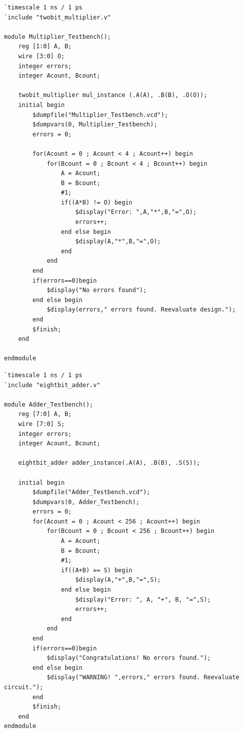 \begin{lstlisting}[style=verilogStyle, caption=Multiplier Testbench in Verilog, label=verilog_multiplierTB]
`timescale 1 ns / 1 ps
`include "twobit_multiplier.v"

module Multiplier_Testbench();
    reg [1:0] A, B;
    wire [3:0] O;
    integer errors;
    integer Acount, Bcount;

    twobit_multiplier mul_instance (.A(A), .B(B), .O(O));
    initial begin
        $dumpfile("Multiplier_Testbench.vcd");
        $dumpvars(0, Multiplier_Testbench);
        errors = 0;

        for(Acount = 0 ; Acount < 4 ; Acount++) begin
            for(Bcount = 0 ; Bcount < 4 ; Bcount++) begin
                A = Acount;
                B = Bcount;
                #1;
                if((A*B) != O) begin
                    $display("Error: ",A,"*",B,"=",O);
                    errors++;
                end else begin
                    $display(A,"*",B,"=",O);
                end
            end
        end
        if(errors==0)begin
            $display("No errors found");
        end else begin
            $display(errors," errors found. Reevaluate design.");
        end
        $finish;
    end

endmodule
\end{lstlisting}


\begin{lstlisting}[style=verilogStyle, caption=Adder Testbench in Verilog, label=verilog_adderTB]
`timescale 1 ns / 1 ps
`include "eightbit_adder.v"

module Adder_Testbench();
    reg [7:0] A, B;
    wire [7:0] S;
    integer errors;
    integer Acount, Bcount;

    eightbit_adder adder_instance(.A(A), .B(B), .S(S));

    initial begin
        $dumpfile("Adder_Testbench.vcd");
        $dumpvars(0, Adder_Testbench);
        errors = 0;
        for(Acount = 0 ; Acount < 256 ; Acount++) begin
            for(Bcount = 0 ; Bcount < 256 ; Bcount++) begin
                A = Acount;
                B = Bcount;
                #1;
                if((A+B) == S) begin
                    $display(A,"+",B,"=",S);
                end else begin
                    $display("Error: ", A, "+", B, "=",S);
                    errors++;
                end
            end
        end
        if(errors==0)begin
            $display("Congratulations! No errors found.");
        end else begin
            $display("WARNING! ",errors," errors found. Reevaluate circuit.");
        end
        $finish;
    end
endmodule
\end{lstlisting}


